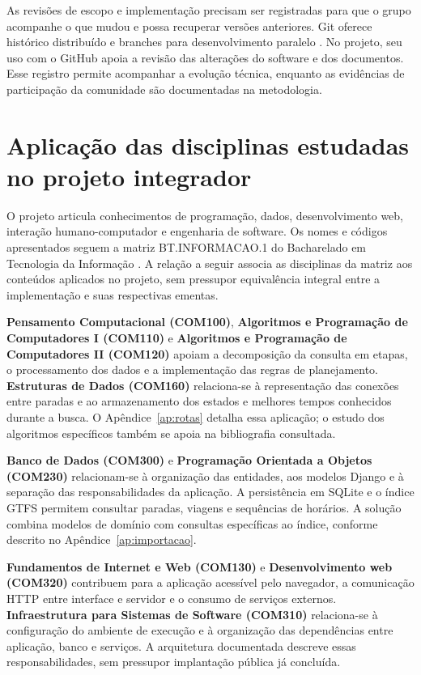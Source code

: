 \documentclass[12pt,oneside,a4paper,brazil,chapter=TITLE]{abntex2}
\let\papsection\section
\renewcommand{\section}{\clearpage\papsection}
\begin{document}
As revisões de escopo e implementação precisam ser registradas para que o grupo acompanhe o que mudou e possa recuperar versões anteriores. Git oferece histórico distribuído e branches para desenvolvimento paralelo \citep{git}. No projeto, seu uso com o GitHub apoia a revisão das alterações do software e dos documentos. Esse registro permite acompanhar a evolução técnica, enquanto as evidências de participação da comunidade são documentadas na metodologia.



\section{Aplicação das disciplinas estudadas no projeto integrador}
O projeto articula conhecimentos de programação, dados, desenvolvimento web, interação humano-computador e engenharia de software. Os nomes e códigos apresentados seguem a matriz BT.INFORMACAO.1 do Bacharelado em Tecnologia da Informação \citep{matriz2026}. A relação a seguir associa as disciplinas da matriz aos conteúdos aplicados no projeto, sem pressupor equivalência integral entre a implementação e suas respectivas ementas.

\textbf{Pensamento Computacional (COM100)}, \textbf{Algoritmos e Programação de Computadores I (COM110)} e \textbf{Algoritmos e Programação de Computadores II (COM120)} apoiam a decomposição da consulta em etapas, o processamento dos dados e a implementação das regras de planejamento. \textbf{Estruturas de Dados (COM160)} relaciona-se à representação das conexões entre paradas e ao armazenamento dos estados e melhores tempos conhecidos durante a busca. O Apêndice~\ref{ap:rotas} detalha essa aplicação; o estudo dos algoritmos específicos também se apoia na bibliografia consultada.

\textbf{Banco de Dados (COM300)} e \textbf{Programação Orientada a Objetos (COM230)} relacionam-se à organização das entidades, aos modelos Django e à separação das responsabilidades da aplicação. A persistência em SQLite e o índice GTFS permitem consultar paradas, viagens e sequências de horários. A solução combina modelos de domínio com consultas específicas ao índice, conforme descrito no Apêndice~\ref{ap:importacao}.

\textbf{Fundamentos de Internet e Web (COM130)} e \textbf{Desenvolvimento web (COM320)} contribuem para a aplicação acessível pelo navegador, a comunicação HTTP entre interface e servidor e o consumo de serviços externos. \textbf{Infraestrutura para Sistemas de Software (COM310)} relaciona-se à configuração do ambiente de execução e à organização das dependências entre aplicação, banco e serviços. A arquitetura documentada descreve essas responsabilidades, sem pressupor implantação pública já concluída.
\end{document}
